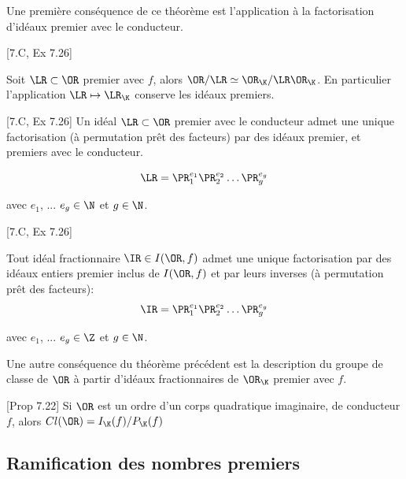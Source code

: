 Une première conséquence de ce théorème est l'application à la factorisation d'idéaux premier avec le conducteur.

\begin{Coro}\cite{Cox}[7.C, Ex 7.26]
	
	Soit $\LR\subset\OR$ premier avec $f$, alors $\OR/\LR \simeq \OR_{\K}/\LR\OR_{\K}$. En particulier l'application $\LR\mapsto\LR_{\K}$ conserve les idéaux premiers. 
\end{Coro}

\begin{Coro}\cite{Cox}[7.C, Ex 7.26]
	Un idéal $\LR\subset\OR$ premier avec le conducteur admet une unique factorisation (à permutation prêt des facteurs) par des idéaux premier, et premiers avec le conducteur.
	
	\begin{equation*}
		\LR = \PR_{1}^{e_{1}}\PR_{2}^{e_{2}}\ldots\PR_{g}^{e_{g}}
	\end{equation*}
	
	avec $e_{1}$, ... $e_{g}\in\N$ et $g\in\N$.
	
\end{Coro}

\begin{Coro}\cite{Cox}[7.C, Ex 7.26]
	
	Tout idéal fractionnaire $\IR \in I(\OR,f)$ admet une unique factorisation par des idéaux entiers premier inclus de $I(\OR,f)$ et par leurs inverses (à permutation prêt des facteurs):
	\begin{equation*}
		\IR = \PR_{1}^{e_{1}}\PR_{2}^{e_{2}}\ldots\PR_{g}^{e_{g}}
	\end{equation*}
	
	avec $e_{1}$, ... $e_{g}\in\Z$ et $g\in\N$.
	
\end{Coro}

Une autre conséquence du théorème précédent est la description du groupe de classe de $\OR$ à partir d'idéaux fractionnaires de $\OR_{\K}$ premier avec $f$.

\begin{Prop}\cite{Cox}[Prop 7.22]
	Si $\OR$ est un ordre d'un corps quadratique imaginaire, de conducteur $f$, alors $Cl(\OR) =  I_{\K}(f)/P_{\K}(f)$
\end{Prop}







\subsection{Ramification des nombres premiers}

